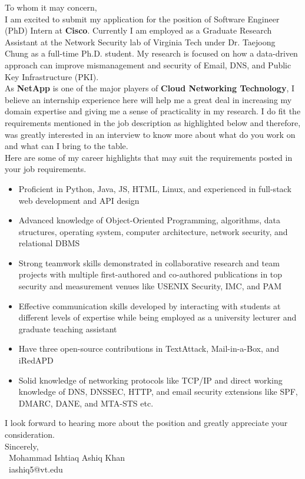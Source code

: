 \documentclass{article}
\begin{document}
To whom it may concern,\\

I am excited to submit my application for the position of Software Engineer (PhD) Intern at \textbf{Cisco}.
Currently I am employed as a Graduate Research Assistant at the Network Security lab of Virginia Tech under Dr.
Taejoong Chung as a full-time Ph.D. student. My research is focused on how a data-driven approach can improve
mismanagement and security of Email, DNS, and Public Key Infrastructure (PKI).\\


As \textbf{NetApp} is one of the major players of \textbf{Cloud Networking Technology}, I believe an internship
experience here will help me a great deal in increasing my domain expertise and giving me a sense of practicality
in my research. I do fit the requirements mentioned in the job description as highlighted below and therefore,
was greatly interested in an interview to know more about what do you work on and what can I bring to the table.\\

Here are some of my career highlights that may suit the requirements posted in your job requirements.\\

\begin{itemize}
    \item Proficient in Python, Java, JS, HTML, Linux, and experienced in full-stack web development and
    API design
    \item Advanced knowledge of Object-Oriented Programming, algorithms, data structures, operating system,
    computer architecture, network security, and relational DBMS
    \item Strong teamwork skills demonstrated in collaborative research and team projects with multiple
    first-authored and co-authored publications in top security and measurement venues like USENIX Security,
    IMC, and PAM
    \item Effective communication skills developed by interacting with students at different levels of expertise
    while being employed as a university lecturer and graduate teaching assistant
    \item Have three open-source contributions in TextAttack, Mail-in-a-Box, and iRedAPD
    \item Solid knowledge of networking protocols like TCP/IP and direct working knowledge of DNS, DNSSEC, HTTP,
    and email security extensions like SPF, DMARC, DANE, and MTA-STS etc.
\end{itemize}

I look forward to hearing more about the position and greatly appreciate your consideration.\\


Sincerely,\\
~Mohammad Ishtiaq Ashiq Khan\\
~iashiq5@vt.edu\\
\end{document}
